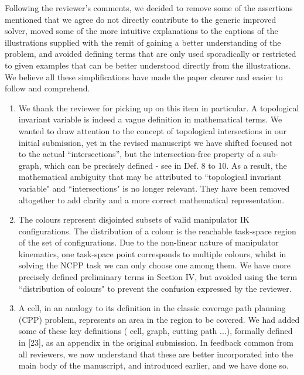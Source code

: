 \documentclass[11pt]{article}
\begin{document}
\begin{enumerate}[I.]
Following the reviewer's comments, we decided to remove some of the assertions mentioned that we agree do not directly contribute to the generic  improved solver, 
moved some of the more intuitive explanations to the captions of the illustrations supplied with the remit of gaining a better understanding of the problem, 
and avoided defining terms that are only used sporadically or restricted to given examples that can be better understood directly from the illustrations. 
We believe all these simplifications have made the paper clearer and easier to follow and comprehend. 

\noindent
\begin{enumerate}
\item We thank the reviewer for picking up on this item in particular. A topological invariant variable is indeed a vague definition in mathematical terms. 
We wanted to draw attention to the concept of topological intersections %
in our initial submission, yet %
in the revised manuscript we have shifted focused not to the actual ``intersections'',  but the intersection-free property of a sub-graph, 
which can be precisely defined - see in Def. 8 to 10. 
As a result, the mathematical ambiguity that may be attributed to ``topological invariant variable" and ``intersections" is no longer relevant. 
They have been removed altogether to add clarity and a more correct mathematical representation. 
\item The colours represent disjointed subsets of valid manipulator IK configurations. 
The distribution of a colour is the reachable task-space region of the set of configurations. 
Due to the non-linear nature of manipulator kinematics, one task-space point corresponds to multiple colours, whilst in solving the NCPP task we can only choose one among them. 
We have more precisely defined preliminary terms in Section IV, but avoided using the term ``distribution of colours" to prevent the confusion expressed by the reviewer. 
\item A cell, in an analogy to its definition in the classic coverage path planning (CPP) problem, represents an area in the region to be covered. 
We had added some of these key definitions ( cell, graph, cutting path ...), formally defined in [23], as an appendix in the original submission. 
In feedback common from all reviewers, we now understand that these are better incorporated into the main body of the manuscript, and introduced earlier, and we have done so.  

\end{enumerate}
\end{enumerate}
\end{document}

